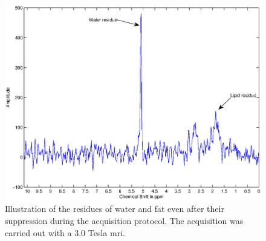 \begin{figure}
  \centering
  \includegraphics[width=0.6\linewidth]{12_figures/figures/water/water_fat.eps}
  \caption{Illustration of the residues of water and fat even after their suppression during the acquisition protocol. The acquisition was carried out with a 3.0 Tesla \ac{mri}.}
  \label{fig:waterfat}
\end{figure}

